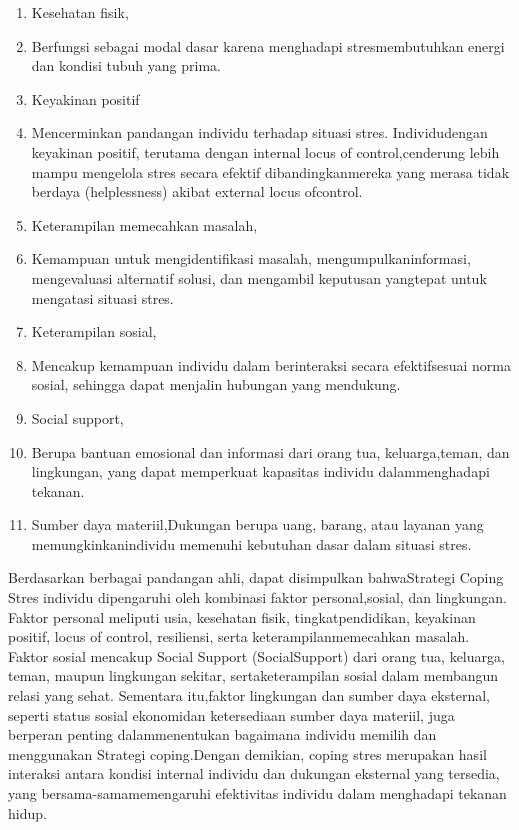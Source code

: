 \documentclass[../manperil.tex]{subfiles}
\begin{document}
\begin{enumerate}
	\item Kesehatan fisik,
	\item[] Berfungsi sebagai modal dasar karena menghadapi stresmembutuhkan energi dan kondisi tubuh yang prima.
	\item Keyakinan positif
	\item[] Mencerminkan pandangan individu terhadap situasi stres. Individudengan keyakinan positif, terutama dengan internal locus of control,cenderung lebih mampu mengelola stres secara efektif dibandingkanmereka yang merasa tidak berdaya (helplessness) akibat external locus ofcontrol.
	\item Keterampilan memecahkan masalah,
	\item[] Kemampuan untuk mengidentifikasi masalah, mengumpulkaninformasi, mengevaluasi alternatif solusi, dan mengambil keputusan yangtepat untuk mengatasi situasi stres.
	\item Keterampilan sosial,
	\item[] Mencakup kemampuan individu dalam berinteraksi secara efektifsesuai norma sosial, sehingga dapat menjalin hubungan yang mendukung.
	\item Social support,
	\item[] Berupa bantuan emosional dan informasi dari orang tua, keluarga,teman, dan lingkungan, yang dapat memperkuat kapasitas individu dalammenghadapi tekanan.
	\item[] Sumber daya materiil,Dukungan berupa uang, barang, atau layanan yang memungkinkanindividu memenuhi kebutuhan dasar dalam situasi stres.
\end{enumerate}
Berdasarkan berbagai pandangan ahli, dapat disimpulkan bahwaStrategi Coping Stres individu dipengaruhi oleh kombinasi faktor personal,sosial, dan lingkungan. Faktor personal meliputi usia, kesehatan fisik, tingkatpendidikan, keyakinan positif, locus of control, resiliensi, serta keterampilanmemecahkan masalah. Faktor sosial mencakup Social Support (SocialSupport) dari orang tua, keluarga, teman, maupun lingkungan sekitar, sertaketerampilan sosial dalam membangun relasi yang sehat. Sementara itu,faktor lingkungan dan sumber daya eksternal, seperti status sosial ekonomidan ketersediaan sumber daya materiil, juga berperan penting dalammenentukan bagaimana individu memilih dan menggunakan Strategi coping.Dengan demikian, coping stres merupakan hasil interaksi antara kondisi internal individu dan dukungan eksternal yang tersedia, yang bersama-samamemengaruhi efektivitas individu dalam menghadapi tekanan hidup.





\end{document}
